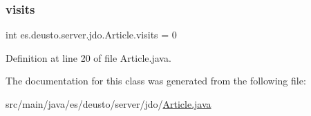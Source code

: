\subsubsection{\texorpdfstring{visits}{visits}}
{\footnotesize\ttfamily int es.\+deusto.\+server.\+jdo.\+Article.\+visits = 0}



Definition at line 20 of file Article.\+java.



The documentation for this class was generated from the following file\+:\begin{DoxyCompactItemize}
\item 
src/main/java/es/deusto/server/jdo/\hyperlink{_article_8java}{Article.\+java}\end{DoxyCompactItemize}
